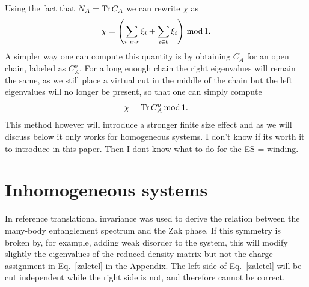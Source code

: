 \documentclass[twocolumn,amsmath,longbibliography,amssymb,superscriptaddress]{revtex4-1}
\newcommand{\carlos}[1]{{\color{red} #1}}
\begin{document}
Using the fact that $N_A = \Tr C_A$ we can rewrite $\chi$ as
\begin{equation}
\chi = \left(\sum_{i\ in r} \xi_i+ \sum_{i\in b}\xi_i\right) \, {\rm mod} \, 1.
\end{equation}
A simpler way one can compute this quantity is by obtaining $C_A$ for an open chain, labeled as $C_A^{ o}$. For a long enough chain the right eigenvalues will remain the same, as we still place a virtual cut in the middle of the chain but the left eigenvalues will no longer be present, so that one can simply compute
\begin{equation}
\chi = \Tr C_A^{o} \, {\rm mod} \, 1.
\end{equation}
This method however will introduce a stronger finite size effect and as we will discuss below it only works for homogeneous systems. \carlos{I don't know if its worth it to introduce in this paper. Then I dont know what to do for the ES = winding. }


\section{Inhomogeneous systems}


In reference \cite{Zaletel2014} translational invariance was used to derive the relation between the many-body entanglement spectrum and the Zak phase. If this symmetry is broken by, for example, adding weak disorder to the system, this will modify slightly the eigenvalues of the reduced density matrix but not the charge assignment in Eq.~\eqref{zaletel} in the Appendix. The left side of Eq.~\eqref{zaletel} will be cut independent while the right side is not, and therefore cannot be correct. 
\end{document}
